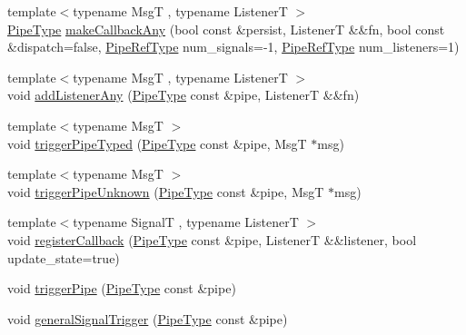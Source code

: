 \begin{DoxyCompactItemize}
\item 
{\footnotesize template$<$typename MsgT , typename ListenerT $>$ }\\\hyperlink{namespacevt_ac9852acda74d1896f48f406cd72c7bd3}{Pipe\+Type} \hyperlink{structvt_1_1pipe_1_1_pipe_manager_base_a465621a26a764f147228e8f814ac5d31}{make\+Callback\+Any} (bool const \&persist, ListenerT \&\&fn, bool const \&dispatch=false, \hyperlink{namespacevt_ace18d74dd489d9ea506d38789fffce34}{Pipe\+Ref\+Type} num\+\_\+signals=-\/1, \hyperlink{namespacevt_ace18d74dd489d9ea506d38789fffce34}{Pipe\+Ref\+Type} num\+\_\+listeners=1)
\item 
{\footnotesize template$<$typename MsgT , typename ListenerT $>$ }\\void \hyperlink{structvt_1_1pipe_1_1_pipe_manager_base_aee28bc7a33e3a0b796aa8fcdd6f72bd9}{add\+Listener\+Any} (\hyperlink{namespacevt_ac9852acda74d1896f48f406cd72c7bd3}{Pipe\+Type} const \&pipe, ListenerT \&\&fn)
\item 
{\footnotesize template$<$typename MsgT $>$ }\\void \hyperlink{structvt_1_1pipe_1_1_pipe_manager_base_a34492ef027a92525ca5acc4e86b360ce}{trigger\+Pipe\+Typed} (\hyperlink{namespacevt_ac9852acda74d1896f48f406cd72c7bd3}{Pipe\+Type} const \&pipe, MsgT $\ast$msg)
\item 
{\footnotesize template$<$typename MsgT $>$ }\\void \hyperlink{structvt_1_1pipe_1_1_pipe_manager_base_ad21185d07e9c3a0206d3d5a791f668a3}{trigger\+Pipe\+Unknown} (\hyperlink{namespacevt_ac9852acda74d1896f48f406cd72c7bd3}{Pipe\+Type} const \&pipe, MsgT $\ast$msg)
\item 
{\footnotesize template$<$typename SignalT , typename ListenerT $>$ }\\void \hyperlink{structvt_1_1pipe_1_1_pipe_manager_base_a27f1aea903f8e05655eb84ae1474c729}{register\+Callback} (\hyperlink{namespacevt_ac9852acda74d1896f48f406cd72c7bd3}{Pipe\+Type} const \&pipe, ListenerT \&\&listener, bool update\+\_\+state=true)
\item 
void \hyperlink{structvt_1_1pipe_1_1_pipe_manager_base_a32f82a02196fe42e98ae3b628b73ae6d}{trigger\+Pipe} (\hyperlink{namespacevt_ac9852acda74d1896f48f406cd72c7bd3}{Pipe\+Type} const \&pipe)
\item 
void \hyperlink{structvt_1_1pipe_1_1_pipe_manager_base_a27d24548529db938aeeb6fe11af985a1}{general\+Signal\+Trigger} (\hyperlink{namespacevt_ac9852acda74d1896f48f406cd72c7bd3}{Pipe\+Type} const \&pipe)

\end{DoxyCompactItemize}
